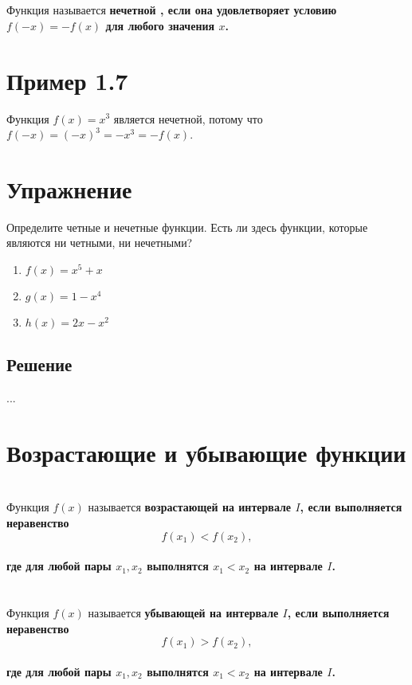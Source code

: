 \documentclass[a4paper,14pt]{report}
\begin{document}
\section*{ }
\noindent
Функция называется \bf нечетной \rm, если она удовлетворяет условию $f(-x) = -f(x)$ для любого значения $x$.
\section*{ Пример 1.7}
Функция $f(x) = x^3$ является нечетной, потому что $f(-x) = (-x)^3 = -x^3 = -f(x)$.

\section*{ Упражнение}
Определите четные и нечетные функции. Есть ли здесь функции, которые являются ни четными, ни нечетными?
\begin{enumerate}
	\item $f(x) = x^5 + x$
	\item $g(x) = 1 - x^4$
	\item $h(x) = 2x - x^2$
\end{enumerate}
\subsection*{ Решение}
...


\section*{\colorbox{light-blue}{Возрастающие и убывающие функции}}
\section*{ }
\noindent
Функция $f(x)$ называется \bf возрастающей \rm на интервале $I$, если выполняется неравенство \[ f(x_1) < f(x_2), \] \\ где для любой пары $x_1, x_2$ выполнятся $x_1 < x_2$ на интервале $I$.
\section*{ }
\noindent
Функция $f(x)$ называется \bf убывающей \rm на интервале $I$, если выполняется неравенство \[ f(x_1) > f(x_2), \] \\ где для любой пары $x_1, x_2$ выполнятся  $x_1 < x_2$ на интервале $I$.
\end{document}
